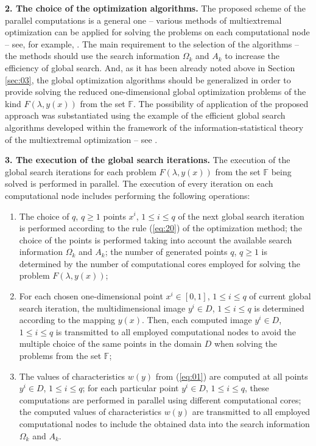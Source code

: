 \documentclass{svproc}
\begin{document}
\textbf{2. The choice of the optimization algorithms.} The proposed scheme of the parallel computations is a general one -- various methods of multiextremal optimization can be applied for solving the problems on each computational node -- see, for example, \cite{x18,x20,x29,x30,x31,x32,x33,x34,x35}. The main requirement to the selection of the algorithms -- the methods should use the search information $\Omega
_k$ and $A_k$ to increase the efficiency of global search. And, as it has been already noted above in Section \ref{sec:03}, the global optimization algorithms should be generalized in order to provide solving the reduced one-dimensional global optimization problems of the kind $F(\lambda,y(x))$ from the set $\mathbb{F}$. The possibility of application of the proposed approach was substantiated using the example of the efficient global search algorithms developed within the framework of the information-statistical theory of the multiextremal optimization -- see \cite{x12,x13,x14,x15,x16,x17,x18}.

\textbf{3. The execution of the global search iterations.} The execution of the global search iterations for each problem $F(\lambda,y(x))$ from the set $\mathbb{F}$ being solved is performed in parallel. The execution of every iteration on each computational node includes performing the following operations:
\begin{enumerate}
	\item The choice of $q$, $q \geq 1$ points $x^i$, $1\leq i\leq q$ of the next global search iteration is performed according to the rule (\ref{eq:20}) of the optimization method; the choice of the points is performed taking into account the available search information $\Omega_k$ and $A_k$; the number of generated points $q$, $q\geq 1$ is determined by the number of computational cores employed for solving the problem $F(\lambda,y(x))$;
	\item For each chosen one-dimensional point $x^i \in [0,1]$, $1 \leq i \leq q$ of current global search iteration, the multidimensional image $y^i \in D$, $1 \leq i \leq q$ is determined according to the mapping $y(x)$. Then, each computed image $y^i \in D$, $1 \leq i \leq q$ is transmitted to all employed computational nodes to avoid the multiple choice of the same points in the domain $D$ when solving the problems from the set $\mathbb{F}$;
	\item The values of characteristics $w(y)$ from (\ref{eq:01}) are computed at all points $y^i \in D$, $1 \leq i \leq q$; for each particular point $y^i \in D$, $1 \leq i \leq q$, these computations are performed in parallel using different computational cores; the computed values of characteristics $w(y)$ are transmitted to all employed computational nodes to include the obtained data into the search information $\Omega_k$ and $A_k$.
\end{enumerate}
\end{document}
